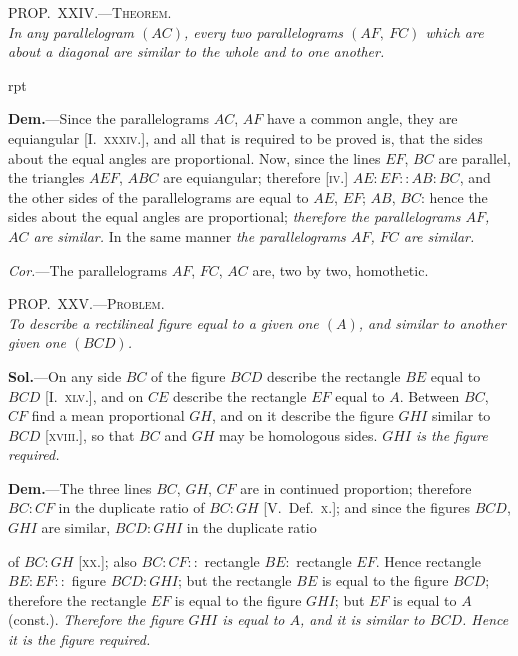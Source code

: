 \documentclass[oneside]{book}
\newcounter{wrapwidth}
\newcommand\myprop[2]{
\bigskip\Needspace*{4\baselineskip}\begin{center}\textsc{#1}\\\medskip\emph{#2}\par\end{center}
}
\newcommand\imgflow[3]{
\setcounter{wrapwidth}{#1}

\begin{wrapfigure}[#2]{r}{\value{wrapwidth}pt}
\begin{center}
\vspace{-0.3in}

\end{center}
\end{wrapfigure}
}
\newcommand\imgcent[2]{
\begin{center}

\end{center}
}
\begin{document}
\myprop{PROP\@.~XXIV\@.---Theorem.}{In any parallelogram $(AC)$, every two parallelograms
$(AF,\ FC)$ which are about a diagonal are similar to the
whole and to one another.}


\imgflow{80}{8}{f204}

\textbf{Dem.}---Since the parallelograms $AC$, $AF$ have a
common angle, they are equiangular
[I.~\textsc{xxxiv.}], and all that is required to
be proved is, that the sides about the
equal angles are proportional. Now,
since the lines $EF$, $BC$ are parallel, the
triangles $AEF$, $ABC$ are equiangular;
therefore [\textsc{iv.}] $AE : EF :: AB : BC$,
and the other sides of the parallelograms
are equal to $AE$, $EF$; $AB$, $BC$: hence the sides
about the equal angles are proportional; \emph{therefore the
parallelograms $AF$, $AC$ are similar.} In the same manner
\emph{the parallelograms $AF$, $FC$ are similar.}

\emph{Cor.}---The parallelograms $AF$, $FC$, $AC$ are, two by
two, homothetic.

\myprop{PROP\@.~XXV\@.---Problem.}{To describe a rectilineal figure equal to a given one $(A)$,
and similar to another given one $(BCD)$.}

\textbf{Sol.}---On any side $BC$ of the figure $BCD$ describe the
rectangle $BE$ equal to $BCD$ [I.~\textsc{xlv.}], and on $CE$ describe
the rectangle $EF$ equal to $A$. Between $BC$, $CF$
find a mean proportional $GH$, and on it describe the
figure $GHI$ similar to $BCD$ [\textsc{xviii.}], so that $BC$ and
$GH$ may be homologous sides. \emph{$GHI$ is the figure required.}


\imgcent{240}{f205}

\textbf{Dem.}---The three lines $BC$, $GH$, $CF$ are in continued
proportion; therefore $BC : CF$ in the duplicate ratio
of $BC : GH$ [V.\ Def.~\textsc{x.}]; and since the figures $BCD$,
$GHI$ are similar, $BCD : GHI$ in the duplicate ratio

of $BC : GH$ [\textsc{xx.}]; also $BC : CF ::$ rectangle $BE :$
rectangle $EF$. Hence rectangle $BE : EF ::$ figure
$BCD : GHI$; but the rectangle $BE$ is equal to the
figure $BCD$; therefore the rectangle $EF$ is equal to
the figure $GHI$; but $EF$ is equal to $A$ (const.). \emph{Therefore
the figure $GHI$ is equal to $A$, and it is similar to
$BCD$. Hence it is the figure required.}
\end{document}
